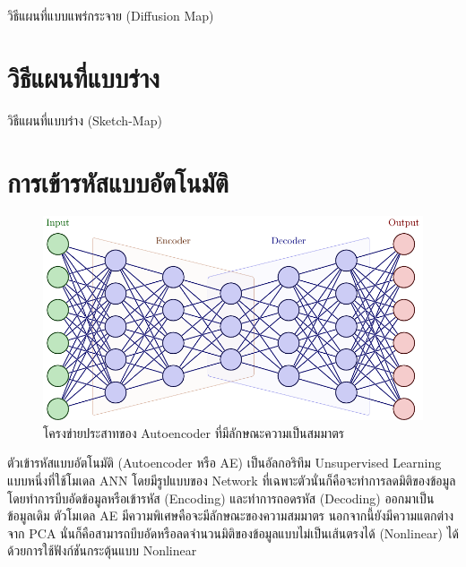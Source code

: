 วิธีแผนที่แบบแพร่กระจาย (Diffusion Map)

\section{วิธีแผนที่แบบร่าง}
\label{sec:sketch_map}

วิธีแผนที่แบบร่าง (Sketch-Map)

\section{การเข้ารหัสแบบอัตโนมัติ}
\label{sec:autoencoder}

\begin{figure}[H]
    \centering
    \includegraphics[width=\linewidth]{fig/autoencoder.pdf}
    \caption{โครงข่ายประสาทของ Autoencoder ที่มีลักษณะความเป็นสมมาตร}
    \label{fig:autoencoder}
\end{figure}

ตัวเข้ารหัสแบบอัตโนมัติ (Autoencoder หรือ AE) เป็นอัลกอริทึม Unsupervised Learning แบบหนึ่งที่ใช้โมเดล ANN โดยมีรูปแบบของ 
Network ที่เฉพาะตัวนั่นก็คือจะทำการลดมิติของข้อมูลโดยทำการบีบอัดข้อมูลหรือเข้ารหัส (Encoding) และทำการถอดรหัส (Decoding) 
ออกมาเป็นข้อมูลเดิม\autocite{ballard1987} ตัวโมเดล AE มีความพิเศษคือจะมีลักษณะของความสมมาตร นอกจากนี้ยังมีความแตกต่างจาก PCA 
นั่นก็คือสามารถบีบอัดหรือลดจำนวนมิติของข้อมูลแบบไม่เป็นเส้นตรงได้ (Nonlinear) ได้ด้วยการใช้ฟังก์ชันกระตุ้นแบบ Nonlinear
